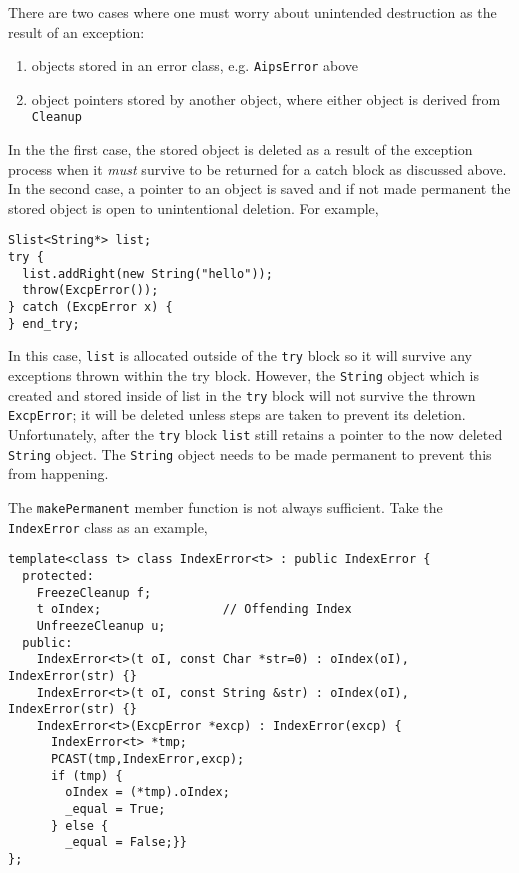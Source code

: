 There are two cases where one must worry about unintended destruction as the
result of an exception:
\begin{enumerate}
\item
objects stored in an error class, e.g. {\tt AipsError} above
\item
object pointers stored by another object, where either object is derived
from {\tt Cleanup}
\end{enumerate}
\noindent
In the the first case, the stored object is deleted as a result of the
exception process when it {\em must} survive to be returned for a catch
block as discussed above. In the second case, a pointer to an object is saved 
and if not made permanent the stored object is open to unintentional 
deletion. For example,
\begin{verbatim}
Slist<String*> list;
try {
  list.addRight(new String("hello"));
  throw(ExcpError());
} catch (ExcpError x) {
} end_try;
\end{verbatim}
\noindent
In this case, {\tt list} is allocated outside of the {\tt try} block so
it will survive any exceptions thrown within the try block. However, the
{\tt String} object which is created and stored inside of list in the
{\tt try} block will not survive the thrown {\tt ExcpError}; it will be
deleted unless steps are taken to prevent its deletion. Unfortunately, after 
the {\tt try} block {\tt list} still retains a pointer to the now deleted 
{\tt String} object. The {\tt String} object needs to be made permanent 
to prevent this from happening.

The {\tt makePermanent} member function is not always sufficient. Take the
{\tt IndexError} class as an example,
\begin{verbatim}
template<class t> class IndexError<t> : public IndexError {
  protected:
    FreezeCleanup f;
    t oIndex;                 // Offending Index
    UnfreezeCleanup u;
  public:
    IndexError<t>(t oI, const Char *str=0) : oIndex(oI), IndexError(str) {}
    IndexError<t>(t oI, const String &str) : oIndex(oI), IndexError(str) {}
    IndexError<t>(ExcpError *excp) : IndexError(excp) {
      IndexError<t> *tmp;
      PCAST(tmp,IndexError,excp);
      if (tmp) {
        oIndex = (*tmp).oIndex;
        _equal = True;
      } else {
        _equal = False;}}
};
\end{verbatim}
\noindent

